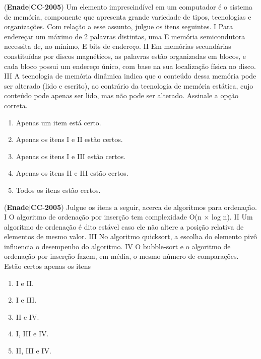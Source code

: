 \documentclass{exam}
\begin{document}
\begin{questions}
\begin{enumerate}[label=\alph*)]
	\end{enumerate}

\question (\textbf{Enade}$|$\textbf{CC}-\textbf{2005}) Um elemento imprescindível em um computador é o sistema de
memória, componente que apresenta grande variedade de tipos,
tecnologias e organizações. Com relação a esse assunto, julgue
os itens seguintes.
I Para endereçar um máximo de 2 palavras distintas, uma
E
memória semicondutora necessita de, no mínimo, E bits de
endereço.
II Em memórias secundárias constituídas por discos
magnéticos, as palavras estão organizadas em blocos, e cada
bloco possui um endereço único, com base na sua
localização física no disco.
III A tecnologia de memória dinâmica indica que o conteúdo
dessa memória pode ser alterado (lido e escrito), ao
contrário da tecnologia de memória estática, cujo conteúdo
pode apenas ser lido, mas não pode ser alterado.
Assinale a opção correta.
	\begin{enumerate}[label=\alph*)]
		\item  Apenas um item está certo.
		\item  Apenas os itens I e II estão certos.
		\item  Apenas os itens I e III estão certos.
		\item  Apenas os itens II e III estão certos.
		\item  Todos os itens estão certos.

	\end{enumerate}

\question (\textbf{Enade}$|$\textbf{CC}-\textbf{2005}) Julgue os itens a seguir, acerca de algoritmos para ordenação.
I O algoritmo de ordenação por inserção tem complexidade
O(n × log n).
II Um algoritmo de ordenação é dito estável caso ele não altere
a posição relativa de elementos de mesmo valor.
III No algoritmo quicksort, a escolha do elemento pivô
influencia o desempenho do algoritmo.
IV O bubble-sort e o algoritmo de ordenação por inserção
fazem, em média, o mesmo número de comparações.
Estão certos apenas os itens
	\begin{enumerate}[label=\alph*)]
		\item  I e II.
		\item  I e III.
		\item  II e IV.
		\item  I, III e IV.
		\item  II, III e IV.

	\end{enumerate}


\end{questions}
\end{document}

